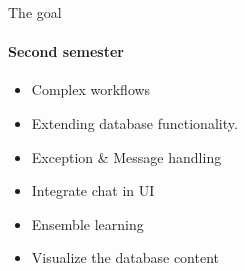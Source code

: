 \begin{frame}{The goal}
\framesubtitle{Second semester}
	\begin{itemize}
		\item Complex workflows
		\item Extending database functionality.
		\item Exception \& Message handling
		\item Integrate chat in UI
		\item Ensemble learning
		\item Visualize the database content
	\end{itemize}
\end{frame}